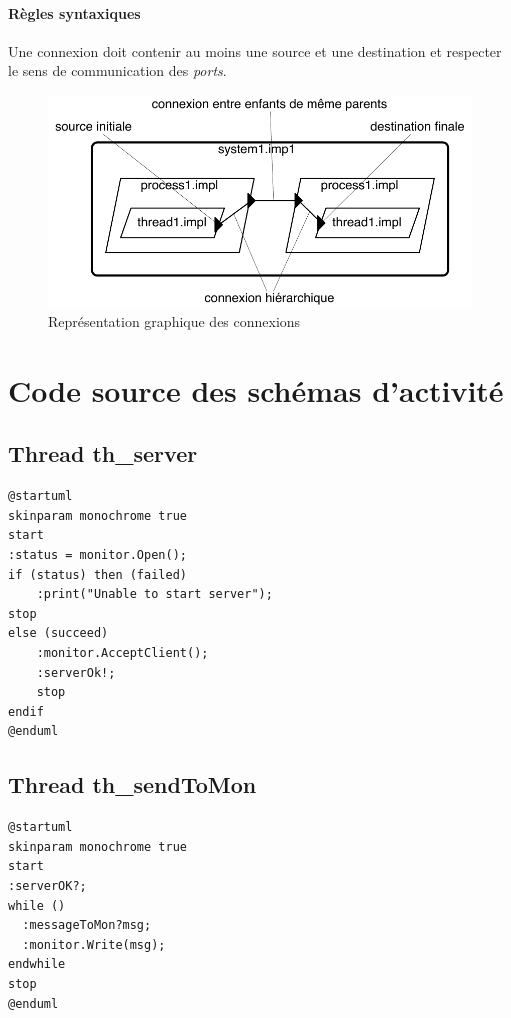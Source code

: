 \documentclass[11pt,a4paper]{paper}
\begin{document}
\begin{appendices}
\paragraph{Règles syntaxiques} Une connexion doit contenir au moins une source et une destination et respecter le sens de communication des {\em ports}.


\begin{figure}[htbp]
\begin{center}
\includegraphics[scale=.6]{figures_pdf/connexion2.pdf}
\caption{Représentation graphique des connexions}
\end{center}
\end{figure}
\FloatBarrier

\newpage
\section{Code source des schémas d'activité}

\begin{multicols}{2}
\subsection{Thread th\_server}
{\scriptsize
\begin{verbatim}
@startuml
skinparam monochrome true
start
:status = monitor.Open();
if (status) then (failed)
    :print("Unable to start server");
stop
else (succeed)
    :monitor.AcceptClient();
    :serverOk!;
    stop
endif
@enduml
\end{verbatim}}

\subsection{Thread th\_sendToMon}
{\scriptsize
\begin{verbatim}
@startuml
skinparam monochrome true
start
:serverOK?;
while ()
  :messageToMon?msg;
  :monitor.Write(msg);
endwhile
stop
@enduml
\end{verbatim}
}


\end{multicols}
\end{appendices}
\end{document}
